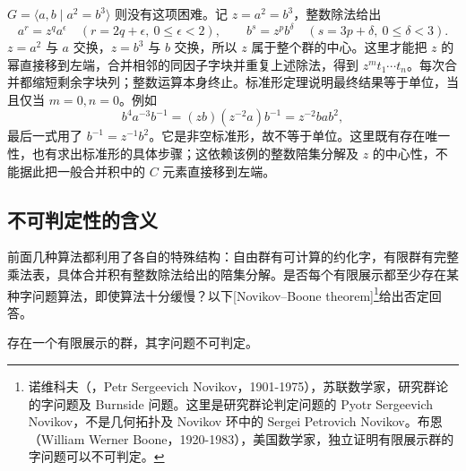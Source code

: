 \ProseParagraphBreak
\(G=\langle a,b\mid a^2=b^3\rangle\) 则没有这项困难。记 \(z=a^2=b^3\)，整数除法给出
\[
	a^r=z^q a^\epsilon\quad(r=2q+\epsilon,\ 0\leq\epsilon<2),\qquad b^s=z^p b^\delta\quad(s=3p+\delta,\ 0\leq\delta<3).
\]
\(z=a^2\) 与 \(a\) 交换，\(z=b^3\) 与 \(b\) 交换，所以 \(z\) 属于整个群的中心。这里才能把 \(z\) 的幂直接移到左端，合并相邻的同因子字块并重复上述除法，得到 \(z^m t_1\cdots t_n\)。每次合并都缩短剩余字块列；整数运算本身终止。标准形定理说明最终结果等于单位，当且仅当 \(m=0,n=0\)。例如
\[
	b^4a^{-3}b^{-1} =(zb)(z^{-2}a)b^{-1} =z^{-2}bab^2,
\]
最后一式用了 \(b^{-1}=z^{-1}b^2\)。它是非空标准形，故不等于单位。这里既有存在唯一性，也有求出标准形的具体步骤；这依赖该例的整数陪集分解及 \(z\) 的中心性，不能据此把一般合并积中的 \(C\) 元素直接移到左端。

\subsection{不可判定性的含义}
\label{b1:subsec:C03:03}

前面几种算法都利用了各自的特殊结构：自由群有可计算的约化字，有限群有完整乘法表，具体合并积有整数除法给出的陪集分解。是否每个有限展示都至少存在某种字问题算法，即使算法十分缓慢？以下[Novikov--Boone theorem]\footnote{诺维科夫（，Petr Sergeevich Novikov，1901-1975），苏联数学家，研究群论的字问题及 Burnside 问题。这里是研究群论判定问题的 Pyotr Sergeevich Novikov，不是几何拓扑及 Novikov 环中的 Sergei Petrovich Novikov。布恩（William Werner Boone，1920-1983），美国数学家，独立证明有限展示群的字问题可以不可判定。}给出否定回答。

\begin{theorem}\label{b1:thm:C-novikov-boone}
	存在一个有限展示的群，其字问题不可判定。
\end{theorem}

